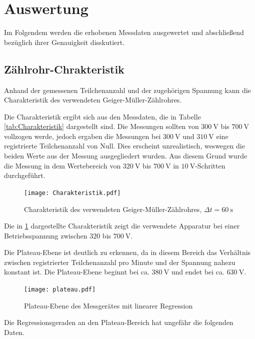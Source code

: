 \section{Auswertung}

Im Folgendem werden die erhobenen Messdaten ausgewertet und abschließend
bezüglich ihrer Genauigkeit disskutiert.

\subsection{Zählrohr-Chrakteristik}

Anhand der gemessenen Teilchenanzahl und der zugehörigen Spannung kann die
Charakteristik des verwendeten Geiger-Müller-Zählrohres.

Die Charakteristik ergibt sich aus den Messdaten, die in Tabelle \ref{tab:Charakteristik}
dargestellt sind. Die Messungen sollten von $\SI{300}{\volt}$ bis $\SI{700}{\volt}$
vollzogen werde, jedoch ergaben die Messungen bei $\SI{300}{\volt}$ und
$\SI{310}{\volt}$ eine registrierte Teilchenanzahl von Null.
Dies erscheint unrealistisch, weswegen die beiden Werte aus der Messung ausgegliedert
wurden. Aus diesem Grund wurde die Messung in dem Wertebereich
von $\SI{320}{\volt}$ bis $\SI{700}{\volt}$ in $\SI{10}{\volt}$-Schritten
durchgeführt.

\begin{figure}
  \centering
  \texttt{[image: Charakteristik.pdf]}
  \caption{Charakteristik des verwendeten Geiger-Müller-Zählrohres, $\Delta t = \SI{60}{\second}$}
  \label{fig:Charakteristik}
\end{figure}

Die in \ref{fig:Charakteristik} dargestellte Charakteristik zeigt die verwendete
Apparatur bei einer Betriebsspannung zwischen $\num{320}$ bis $\SI{700}{\volt}$.

Die Plateau-Ebene ist deutlich zu erkennen, da in diesem Bereich das Verhältnis zwischen
registrierter Teilchenanzahl pro Minute und der Spannung nahezu konstant ist.
Die Plateau-Ebene beginnt bei ca. $\SI{380}{\volt}$ und endet bei ca.
$\SI{630}{\volt}$.

\begin{figure}
  \centering
  \texttt{[image: plateau.pdf]}
  \caption{Plateau-Ebene des Messgerätes mit linearer Regression}
  \label{fig:Plateau}
\end{figure}

Die Regressionsgeraden an den Plateau-Bereich hat ungefähr die folgenden Daten.

